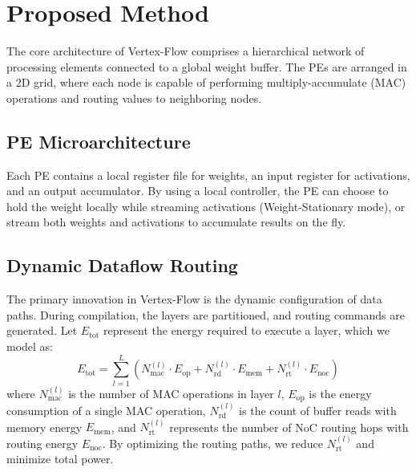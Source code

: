 \section{Proposed Method}
\label{sec:method}
The core architecture of Vertex-Flow comprises a hierarchical network of processing elements connected to a global weight buffer. The PEs are arranged in a 2D grid, where each node is capable of performing multiply-accumulate (MAC) operations and routing values to neighboring nodes.

\subsection{PE Microarchitecture}
Each PE contains a local register file for weights, an input register for activations, and an output accumulator. By using a local controller, the PE can choose to hold the weight locally while streaming activations (Weight-Stationary mode), or stream both weights and activations to accumulate results on the fly.

\subsection{Dynamic Dataflow Routing}
The primary innovation in Vertex-Flow is the dynamic configuration of data paths. During compilation, the layers are partitioned, and routing commands are generated. Let $E_{\text{tot}}$ represent the energy required to execute a layer, which we model as:
\begin{equation}
  E_{\text{tot}} = \sum_{l=1}^{L} \left( N_{\text{mac}}^{(l)} \cdot E_{\text{op}} + N_{\text{rd}}^{(l)} \cdot E_{\text{mem}} + N_{\text{rt}}^{(l)} \cdot E_{\text{noc}} \right)
  \label{eq:energy}
\end{equation}
where $N_{\text{mac}}^{(l)}$ is the number of MAC operations in layer $l$, $E_{\text{op}}$ is the energy consumption of a single MAC operation, $N_{\text{rd}}^{(l)}$ is the count of buffer reads with memory energy $E_{\text{mem}}$, and $N_{\text{rt}}^{(l)}$ represents the number of NoC routing hops with routing energy $E_{\text{noc}}$. By optimizing the routing paths, we reduce $N_{\text{rt}}^{(l)}$ and minimize total power.

